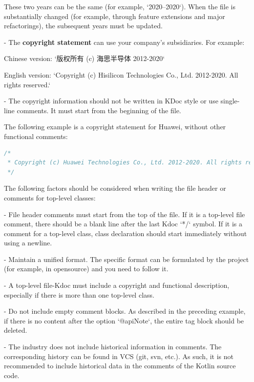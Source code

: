 These two years can be the same (for example, `2020–2020`). When the file is substantially changed (for example, through feature extensions and major refactorings), the subsequent years must be updated.



- The \textbf{copyright statement} can use your company's subsidiaries. For example: \

Chinese version: `版权所有 (c) 海思半导体 2012-2020` \

English version: `Copyright (c) Hisilicon Technologies Co., Ltd. 2012-2020. All rights reserved.`



- The copyright information should not be written in KDoc style or use single-line comments. It must start from the beginning of the file.

The following example is a copyright statement for Huawei, without other functional comments:



\begin{lstlisting}[language=Kotlin]
/*
 * Copyright (c) Huawei Technologies Co., Ltd. 2012-2020. All rights reserved.
 */
\end{lstlisting}


The following factors should be considered when writing the file header or comments for top-level classes:

- File header comments must start from the top of the file. If it is a top-level file comment, there should be a blank line after the last Kdoc `*/` symbol. If it is a comment for a top-level class, class declaration should start immediately without using a newline.

- Maintain a unified format. The specific format can be formulated by the project (for example, in opensource) and you need to follow it.

- A top-level file-Kdoc must include a copyright and functional description, especially if there is more than one top-level class.

- Do not include empty comment blocks. As described in the preceding example, if there is no content after the option `@apiNote`, the entire tag block should be deleted.

- The industry does not include historical information in comments. The corresponding history can be found in VCS (git, svn, etc.). As such, it is not recommended to include historical data in the comments of the Kotlin source code.





